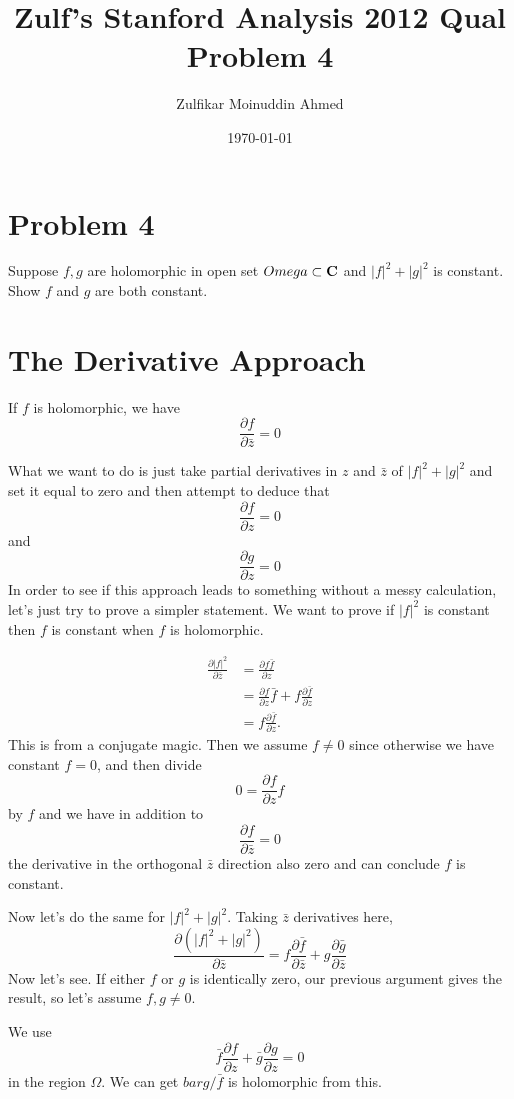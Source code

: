 \documentclass{amsart}
\title{Zulf's Stanford Analysis 2012 Qual Problem 4}
\author{Zulfikar Moinuddin Ahmed}
\date{\today}
\begin{document}
\maketitle

\newcommand{\zbar}{\bar{z}}

\newcommand{\ddzbar}[1]{\ensuremath{\frac{\partial{#1}}{\partial\bar{z}}}}

\newcommand{\ddz}[1]{\ensuremath{\frac{\partial{#1}}{\partial z}}}

\section{Problem 4}

Suppose $f,g$ are holomorphic in open set $\\Omega \subset \mathbf{C}$ and $|f|^2 + |g|^2$ is constant.  Show $f$ and $g$ are both constant.

\section{The Derivative Approach}

If $f$ is holomorphic, we have 
\[
\ddzbar{f} = 0
\]

What we want to do is just take partial derivatives in $z$ and $\bar{z}$ of $|f|^2 + |g|^2$ and set it equal to zero and then attempt to deduce that 
\[
\ddz{f} = 0
\]
and
\[
\ddz{g} = 0
\]
In order to see if this approach leads to something without a messy calculation, let's just try to prove a simpler statement.  We want to prove if $|f|^2$ is constant then $f$ is constant when $f$ is holomorphic.

\begin{align*}
\ddzbar{|f|^2} &= \ddz{ f\bar{f}}\\
 &= \ddz{f} \bar{f} + f \ddz{\bar{f}}\\
 &= f \ddz{\bar{f}}.
\end{align*}
This is from a conjugate magic. Then we assume $f\not= 0$ since otherwise we have constant $f=0$, and then divide 
\[
0 = \ddz{f} f
\]
by $f$ and we have in addition to 
\[
\ddzbar{f}=0
\]
the derivative in the orthogonal $\zbar$ direction also zero and can conclude $f$ is constant.

Now let's do the same for $|f|^2 + |g|^2$. Taking $\zbar$ derivatives here,
\[
\ddzbar{(|f|^2+|g|^2)} = f \ddzbar{\bar{f}} + g \ddzbar{\bar{g}}
\]
Now let's see.  If either $f$ or $g$ is identically zero, our previous argument gives the result, so let's assume $f,g\not=0$.  

We use
\[
\bar{f}\ddz{f} + \bar{g}\ddz{g} = 0
\]
in the region $\Omega$.  We can get $bar{g}/\bar{f}$ is holomorphic from this.  
\end{document}

